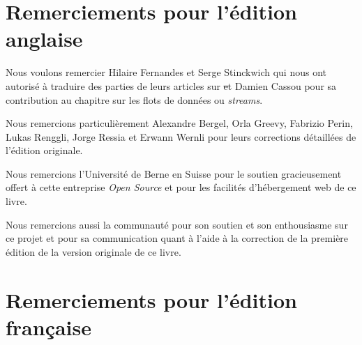 \documentclass[a4paper,10pt,twoside]{book}
\begin{document}



\section*{Remerciements pour l'édition anglaise}


Nous voulons remercier Hilaire Fernandes et Serge Stinckwich qui nous
ont autorisé à traduire des parties de leurs articles sur \st et
Damien Cassou pour sa contribution au chapitre sur les flots de
données ou \emph{streams}.

Nous remercions particulièrement Alexandre Bergel, Orla Greevy,
Fabrizio Perin, Lukas Renggli, Jorge Ressia et Erwann Wernli pour leurs
corrections détaillées %
de l'édition originale. %

Nous remercions l'Université de Berne en Suisse pour le soutien
gracieusement offert à cette entreprise \emph{Open Source} et pour
les facilités d'hébergement web de ce livre.

Nous remercions aussi la communauté \squeak pour son soutien et son
enthousiasme sur ce projet et pour sa communication quant à l'aide à
la correction de la première édition de la version originale %
de ce livre. %

\section*{Remerciements pour l'édition française}
\end{document}
